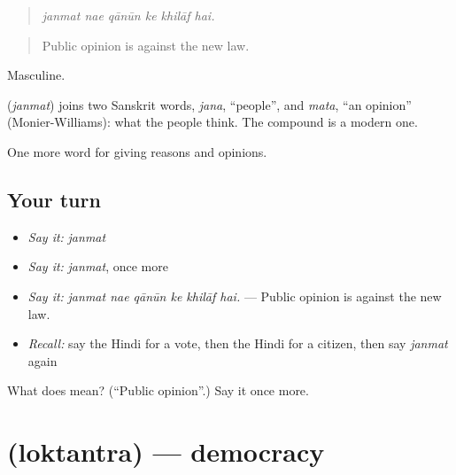 \begin{quote}
     
\end{quote}

\begin{quote}
\emph{janmat nae qānūn ke khilāf hai.}
\end{quote}

\begin{quote}
Public opinion is against the new law.
\end{quote}

Masculine.

\begin{cousinweb}
\textbf{} (\emph{janmat}) joins two Sanskrit words, \emph{jana}, \textquotedblleft{}people\textquotedblright{}, and \emph{mata}, \textquotedblleft{}an opinion\textquotedblright{} (Monier-Williams): what the people think. The compound is a modern one.
\end{cousinweb}

\begin{grammarlens}[title={What you've built}]
One more word for giving reasons and opinions.
\end{grammarlens}

\subsection*{Your turn}
\begin{itemize}
\raggedright
  \item \emph{Say it:} \emph{janmat}
  \item \emph{Say it:} \emph{janmat}, once more
  \item \emph{Say it:} \emph{janmat nae qānūn ke khilāf hai.} — Public opinion is against the new law.
  \item \emph{Recall:} say the Hindi for a vote, then the Hindi for a citizen, then say \emph{janmat} again
\end{itemize}

\begin{tcolorbox}[breakable,colback=teal!4,colframe=teal!35!black,title={Before you move on}]
What does  mean? (\textquotedblleft{}Public opinion\textquotedblright{}.) Say it once more.
\end{tcolorbox}
\section[\texorpdfstring{\hi{लोकतंत्र} (loktantra)}{लोकतंत्र (loktantra)}]{ (loktantra) — democracy}

